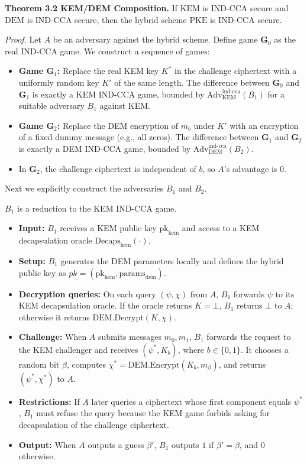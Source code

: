 \noindent\textbf{Theorem 3.2 KEM/DEM Composition.} If $\text{KEM}$ is $\text{IND-CCA}$ secure and $\text{DEM}$ is $\text{IND-CCA}$ secure, then the hybrid scheme $\text{PKE}$ is $\text{IND-CCA}$ secure.

\noindent\textit{Proof.} Let $A$ be an adversary against the hybrid scheme. Define game $\mathbf{G}_0$ as the real IND-CCA game. We construct a sequence of games:
\begin{itemize}
    \item \textbf{Game $\mathbf{G}_1$:} Replace the real KEM key $K^*$ in the challenge ciphertext with a uniformly random key $K'$ of the same length. The difference between $\mathbf{G}_0$ and $\mathbf{G}_1$ is exactly a KEM IND-CCA game, bounded by $\text{Adv}_{\text{KEM}}^{\text{ind-cca}}(B_1)$ for a suitable adversary $B_1$ against KEM.
    \item \textbf{Game $\mathbf{G}_2$:} Replace the DEM encryption of $m_b$ under $K'$ with an encryption of a fixed dummy message (e.g., all zeros). The difference between $\mathbf{G}_1$ and $\mathbf{G}_2$ is exactly a DEM IND-CCA game, bounded by $\text{Adv}_{\text{DEM}}^{\text{ind-cca}}(B_2)$.
    \item In $\mathbf{G}_2$, the challenge ciphertext is independent of $b$, so $A$'s advantage is $0$.
\end{itemize}

Next we explicitly construct the adversaries $B_1$ and $B_2$.

$B_1$ is a reduction to the KEM IND-CCA game.
\begin{itemize}
    \item \textbf{Input:} $B_1$ receives a KEM public key $\text{pk}_{\text{kem}}$ and access to a KEM decapsulation oracle $\text{Decaps}_{\text{kem}}(\cdot)$.
    \item \textbf{Setup:} $B_1$ generates the DEM parameters locally and defines the hybrid public key as $pk = (\text{pk}_{\text{kem}}, \text{params}_{\text{dem}})$.
    \item \textbf{Decryption queries:} On each query $(\psi, \chi)$ from $A$, $B_1$ forwards $\psi$ to its KEM decapsulation oracle. If the oracle returns $K = \bot$, $B_1$ returns $\bot$ to $A$; otherwise it returns $\text{DEM.Decrypt}(K, \chi)$.
    \item \textbf{Challenge:} When $A$ submits messages $m_0, m_1$, $B_1$ forwards the request to the KEM challenger and receives $(\psi^*, K_b)$, where $b \in \{0,1\}$. It chooses a random bit $\beta$, computes $\chi^* = \text{DEM.Encrypt}(K_b, m_\beta)$, and returns $(\psi^*, \chi^*)$ to $A$.
    \item \textbf{Restrictions:} If $A$ later queries a ciphertext whose first component equals $\psi^*$, $B_1$ must refuse the query because the KEM game forbids asking for decapsulation of the challenge ciphertext.
    \item \textbf{Output:} When $A$ outputs a guess $\beta'$, $B_1$ outputs $1$ if $\beta' = \beta$, and $0$ otherwise.
\end{itemize}

